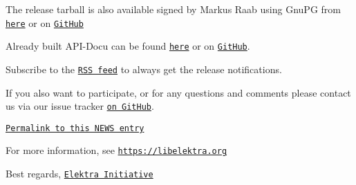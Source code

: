The release tarball is also available signed by Markus Raab using Gnu\+PG from \href{https://www.libelektra.org/ftp/elektra/releases/elektra-0.9.0.tar.gz.gpg}{\tt here} or on \href{https://github.com/ElektraInitiative/ftp/blob/master/releases/elektra-0.9.0.tar.gz.gpg?raw=true}{\tt Git\+Hub}

Already built A\+P\+I-\/\+Docu can be found \href{https://doc.libelektra.org/api/0.9.0/html/}{\tt here} or on \href{https://github.com/ElektraInitiative/doc/tree/master/api/0.9.0}{\tt Git\+Hub}.

Subscribe to the \href{https://www.libelektra.org/news/feed.rss}{\tt R\+SS feed} to always get the release notifications.

If you also want to participate, or for any questions and comments please contact us via our issue tracker \href{http://issues.libelektra.org}{\tt on Git\+Hub}.

\href{https://www.libelektra.org/news/0.9.0-release}{\tt Permalink to this N\+E\+WS entry}

For more information, see \href{https://libelektra.org}{\tt https\+://libelektra.\+org}

Best regards, \href{https://www.libelektra.org/developers/authors}{\tt Elektra Initiative} 